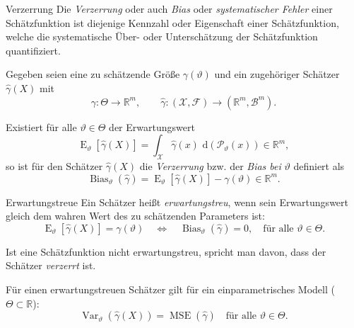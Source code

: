 \begin{defi}[Schätzfunktion]{Verzerrung}
    Die \emph{Verzerrung} oder auch \emph{Bias} oder \emph{systematischer Fehler} einer Schätzfunktion ist diejenige Kennzahl oder Eigenschaft einer Schätzfunktion, welche die systematische Über- oder Unterschätzung der Schätzfunktion quantifiziert.

    Gegeben seien eine zu schätzende Größe $\gamma(\vartheta)$ und ein zugehöriger Schätzer $\hat{\gamma}(X)$ mit
    \[
        \gamma: \Theta \to \mathbb{R}^m, \qquad \hat{\gamma}: (\mathcal{X}, \mathcal{F}) \to (\mathbb{R}^m, \mathcal{B}^m).
    \]

    Existiert für alle $\vartheta \in \Theta$ der Erwartungswert
    \[
        \operatorname{E}_{\vartheta}[\hat{\gamma}(X)] = \int_{\mathcal{X}} \hat{\gamma}(x) \, \, \mathrm{d} (\mathcal{P}_{\vartheta}(x)) \in \mathbb{R}^m,
    \]
    so ist für den Schätzer $\hat{\gamma}(X)$ die \emph{Verzerrung} bzw. der \emph{Bias bei} $\vartheta$ definiert als
    \[
        \operatorname{Bias}_{\vartheta}(\hat{\gamma}) = \operatorname{E}_{\vartheta}[\hat{\gamma}(X)] - \gamma(\vartheta) \in \mathbb{R}^m.
    \]
\end{defi}

\begin{defi}[Schätzfunktion]{Erwartungstreue}
    Ein Schätzer heißt \emph{erwartungstreu}, wenn sein Erwartungswert gleich dem wahren Wert des zu schätzenden Parameters ist:
    \[
        \operatorname{E}_{\vartheta}[\hat{\gamma}(X)] = \gamma(\vartheta) \quad \iff \quad \operatorname{Bias}_{\vartheta}(\hat{\gamma}) = 0, \quad \text{für alle } \vartheta \in \Theta.
    \]

    Ist eine Schätzfunktion nicht erwartungstreu, spricht man davon, dass der Schätzer \emph{verzerrt} ist.

    Für einen erwartungstreuen Schätzer gilt für ein einparametrisches Modell ($\Theta \subset \mathbb{R}$):
    \[
        \operatorname{Var}_{\vartheta}(\hat{\gamma}(X)) = \operatorname{MSE}(\hat{\gamma}) \quad \text{für alle } \vartheta \in \Theta.
    \]
\end{defi}

